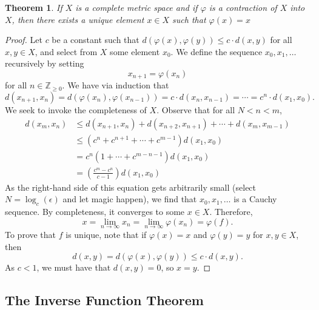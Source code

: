 \documentclass[11pt]{article}
\newtheorem*{theorem*}{Theorem}
\begin{document}
\begin{theorem*}
	If $X$ is a complete metric space and if $\varphi$ is a contraction of $X$ into $X$, then there exists a unique element $x \in X$ such that $\varphi(x) = x$
\end{theorem*}
\begin{adjustwidth}{0.5cm}{}
    \begin{proof}\renewcommand{\qedsymbol}{}
		Let $c$ be a constant such that $d(\varphi(x), \varphi(y)) \le c \cdot d(x, y)$ for all $x, y \in X$, and select from $X$ some element $x_{0}$. We define the sequence $x_{0}, x_{1}, \ldots$ recursively by setting
		\[
			x_{n + 1} = \varphi(x_{n}) 
		\]
		for all $n \in \mathbb{Z}_{\ge 0}$. We have via induction that
		\[
			d(x_{n + 1}, x_{n}) = d(\varphi(x_{n}), \varphi(x_{n - 1})) = c \cdot d(x_{n}, x_{n - 1}) = \cdots = c^{n} \cdot d(x_{1}, x_{0}).
		\]
		We seek to invoke the completeness of $X$. Observe that for all $N < n < m$, 
		\begin{align*}
			d(x_{m}, x_{n}) &\le d(x_{n+1}, x_{n}) + d(x_{n + 2}, x_{n + 1}) + \cdots + d(x_{m}, x_{m - 1}) \\
			&\le (c^{n} + c^{n+1} + \cdots + c^{m-1}) d(x_{1}, x_{0}) \\
			&= c^{n} (1 + \cdots + c^{m - n - 1}) d(x_{1}, x_{0}) \\
			&= \left( \frac{c^{m} - c^{n}}{c - 1} \right) d(x_{1}, x_{0})
		\end{align*}
		As the right-hand side of this equation gets arbitrarily small (select $N = \log_{c}(\epsilon)$ and let magic happen), we find that $x_{0}, x_{1}, \ldots$ is a Cauchy sequence. By completeness, it converges to some $x \in X$. Therefore,
		\[
			x = \lim\limits_{n \to \infty} x_{n} = \lim\limits_{n \to \infty} \varphi(x_{n}) = \varphi(f).
		\]
		To prove that $f$ is unique, note that if $\varphi(x) = x$ and $\varphi(y) = y$ for $x, y \in X$, then
		\[
			d(x, y) = d(\varphi(x), \varphi(y)) \le c \cdot  d(x, y).
		\]
		As $c < 1$, we must have that $d(x, y) = 0$, so $x = y$.
	\end{proof}
\end{adjustwidth}

\subsection{The Inverse Function Theorem}
\end{document}
